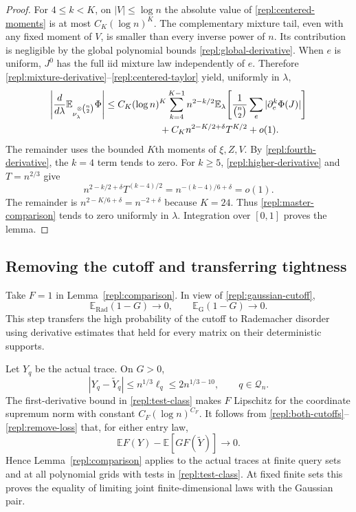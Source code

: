 \begin{proof}
For $4\le k<K$, on $|V|\le\log n$ the absolute value of
\eqref{repl:centered-moments} is at most $C_K(\log n)^K$.  The complementary
mixture tail, even with any fixed moment of $V$, is smaller than every
inverse power of $n$.  Its contribution is negligible by the global
polynomial bounds \eqref{repl:global-derivative}.  When $e$ is uniform,
$J^0$ has the full iid mixture law independently of $e$.  Therefore
\eqref{repl:mixture-derivative}--\eqref{repl:centered-taylor} yield,
uniformly in $\lambda$,
\begin{align}
 \left|\frac d{d\lambda}\mathbb E_{\nu_\lambda^{\otimes\binom n2}}\Phi\right|
 &\le C_K(\log n)^K
   \sum_{k=4}^{K-1}n^{2-k/2}
     \mathbb E_\lambda\!\left[
       \frac1{\binom n2}\sum_e|\partial_e^k\Phi(J)|\right]\notag\\
 &\hspace{2cm}+C_K n^{2-K/2+\delta}T^{K/2}+o(1).             \label{repl:master-comparison}
\end{align}
The remainder uses the bounded $K$th moments of $\xi,Z,V$.
By \eqref{repl:fourth-derivative}, the $k=4$ term tends to zero.
For $k\ge5$, \eqref{repl:higher-derivative} and $T=n^{2/3}$ give
\[
 n^{2-k/2+\delta}T^{(k-4)/2}
      =n^{-(k-4)/6+\delta}=o(1).
\]
The remainder is $n^{2-K/6+\delta}=n^{-2+\delta}$ because $K=24$.
Thus \eqref{repl:master-comparison} tends to zero uniformly in $\lambda$.
Integration over $[0,1]$ proves the lemma.
\end{proof}

\subsection{Removing the cutoff and transferring tightness}

Take $F=1$ in Lemma~\ref{repl:comparison}.  In view of
\eqref{repl:gaussian-cutoff},
\begin{equation}\label{repl:both-cutoffs}
 \mathbb E_{\mathrm{Rad}}(1-G)\longrightarrow0,
 \qquad
 \mathbb E_{\mathrm{G}}(1-G)\longrightarrow0.
\end{equation}
This step transfers the high probability of the cutoff to Rademacher
disorder using derivative estimates that held for every matrix on their
deterministic supports.

Let $Y_q$ be the actual trace.  On $G>0$,
\begin{equation}\label{repl:remove-loss}
 |Y_q-\widetilde Y_q|
 \le n^{1/3}\ell_q
 \le2n^{1/3-10},\qquad q\in\mathcal Q_n.
\end{equation}
The first-derivative bound in \eqref{repl:test-class} makes $F$ Lipschitz
for the coordinate supremum norm with constant $C_F(\log n)^{C_F}$.
It follows from \eqref{repl:both-cutoffs}--\eqref{repl:remove-loss} that,
for either entry law,
\[
 \mathbb E F(Y)-\mathbb E[G F(\widetilde Y)]\longrightarrow0.
\]
Hence Lemma~\ref{repl:comparison} applies to the actual traces at finite query
sets and at all polynomial grids with tests in
\eqref{repl:test-class}.  At fixed finite sets this proves the equality
of limiting joint finite-dimensional laws with the Gaussian pair.

